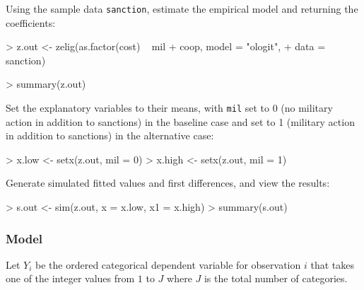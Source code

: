 \documentclass{article}
\begin{document}
\begin{enumerate}
Using the sample data \texttt{sanction}, estimate the empirical model and returning the coefficients:
\begin{Schunk}
\begin{Sinput}
>  z.out <- zelig(as.factor(cost) ~ mil + coop, model = "ologit", 
+                  data = sanction)
\end{Sinput}
\end{Schunk}
\begin{Schunk}
\begin{Sinput}
> summary(z.out)
\end{Sinput}
\end{Schunk}
Set the explanatory variables to their means, with {\tt mil} set
to 0 (no military action in addition to sanctions) in the baseline
case and set to 1 (military action in addition to sanctions) in the
alternative case:
\begin{Schunk}
\begin{Sinput}
>  x.low <- setx(z.out, mil = 0)
>  x.high <- setx(z.out, mil = 1)
\end{Sinput}
\end{Schunk}
Generate simulated fitted values and first differences, and view the results:
\begin{Schunk}
\begin{Sinput}
>  s.out <- sim(z.out, x = x.low, x1 = x.high)
>  summary(s.out)
\end{Sinput}
\end{Schunk}
\end{enumerate}

\subsubsection{Model}

Let $Y_i$ be the ordered categorical dependent variable for
observation $i$ that takes one of the integer values from $1$ to $J$
where $J$ is the total number of categories.
  
\end{document}
